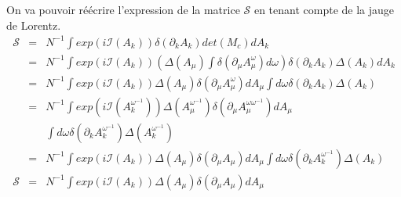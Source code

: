 \documentclass[a4paper,11pt]{article} %
\theoremstyle{plain}
\theoremstyle{definition}
\theoremstyle{remark}
\numberwithin{equation}{section}
\numberwithin{equation}{subsection}
\numberwithin{figure}{section}
\begin{document}
\noindent
On va pouvoir réécrire l'expression de la matrice $\mathcal{S}$ en tenant compte de la jauge de Lorentz.\\
\begin{eqnarray*}
 \mathcal{S} &=& N^{-1} \int exp\left( i \mathcal{I}(A_{k}) \right) \delta(\partial_{k} A_{k} ) det(M_{c} ) dA_{k}\\
                       &=& N^{-1} \int exp\left( i \mathcal{I}(A_{k}) \right) 
\left( \Delta(A_{\mu})\int \delta \left(\partial_{\mu}A^{\omega}_{\mu}\right) d\omega \right) 
\delta(\partial_{k} A_{k} ) \Delta(A_{k}) dA_{k}\\
                      &=& N^{-1} \int exp\left( i \mathcal{I}(A_{k}) \right)
\Delta(A_{\mu}) \delta \left(\partial_{\mu}A^{\omega}_{\mu}\right) dA_{\mu} 
\int d\omega \delta(\partial_{k} A_{k} ) \Delta(A_{k}) \\ 
                      &=& N^{-1} \int exp\left( i \mathcal{I}(A^{\omega^{-1}}_{k}) \right)
\Delta(A^{\omega^{-1}}_{\mu}) \delta \left(\partial_{\mu}A^{\omega \omega^{-1}}_{\mu}\right) dA_{\mu} \nonumber \\
&& \int d\omega \delta(\partial_{k} A^{\omega^{-1}}_{k} ) \Delta(A^{\omega^{-1}}_{k}) \\ 
                       &=& N^{-1} \int exp\left( i \mathcal{I}(A_{k}) \right)
\Delta(A_{\mu}) \delta \left(\partial_{\mu}A_{\mu}\right) dA_{\mu} \int d\omega \delta(\partial_{k} A^{\omega^{-1}}_{k} ) \Delta(A_{k}) \\ 
 \mathcal{S} &=& N^{-1} \int exp\left( i \mathcal{I}(A_{k}) \right)
\Delta(A_{\mu}) \delta \left(\partial_{\mu}A_{\mu}\right) dA_{\mu} 
\end{eqnarray*}
\end{document}
